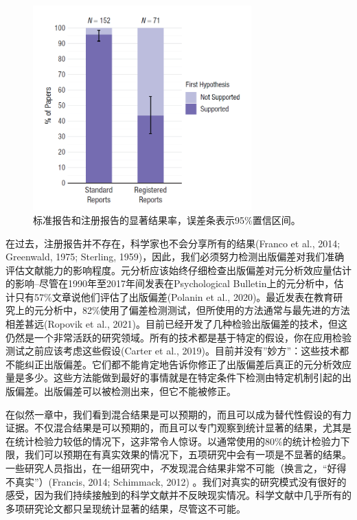 \documentclass[
  letterpaper,
  DIV=11,
  numbers=noendperiod]{scrreprt}
\begin{document}
\begin{figure}

{\centering \includegraphics[width=0.75\textwidth,height=\textheight]{images/scheel.png}

}

\caption{\label{fig-scheel}标准报告和注册报告的显著结果率，误差条表示95\%置信区间。}

\end{figure}

在过去，注册报告并不存在，科学家也不会分享所有的结果(Franco et al.,
2014; Greenwald, 1975; Sterling,
1959)，因此，我们必须努力检测出版偏差对我们准确评估文献能力的影响程度。元分析应该始终仔细检查出版偏差对元分析效应量估计的影响--尽管在1990年至2017年间发表在Psychological
Bulletin上的元分析中，估计只有57\%文章说他们评估了出版偏差(Polanin et
al.,
2020)。最近发表在教育研究上的元分析中，82\%使用了偏差检测测试，但所使用的方法通常与最先进的方法相差甚远(Ropovik
et al.,
2021)。目前已经开发了几种检验出版偏差的技术，但这仍然是一个非常活跃的研究领域。所有的技术都是基于特定的假设，你在应用检验测试之前应该考虑这些假设(Carter
et al.,
2019)。目前并没有''妙方''：这些技术都不能纠正出版偏差。它们都不能肯定地告诉你修正了出版偏差后真正的元分析效应量是多少。这些方法能做到最好的事情就是在特定条件下检测由特定机制引起的出版偏差。出版偏差可以被检测出来，但它不能被修正。

在似然一章中，我们看到混合结果是可以预期的，而且可以成为替代性假设的有力证据。不仅混合结果是可以预期的，而且可以专门观察到统计显著的结果，尤其是在统计检验力较低的情况下，这非常令人惊讶。以通常使用的80\%的统计检验力下限，我们可以预期在有真实效果的情况下，五项研究中会有一项是不显著的结果。一些研究人员指出，在一组研究中，\emph{不}发现混合结果非常不可能（换言之，``好得不真实''）(Francis,
2014; Schimmack, 2012)
。我们对真实的研究模式没有很好的感受，因为我们持续接触到的科学文献并不反映现实情况。科学文献中几乎所有的多项研究论文都只呈现统计显著的结果，尽管这不可能。
\end{document}
